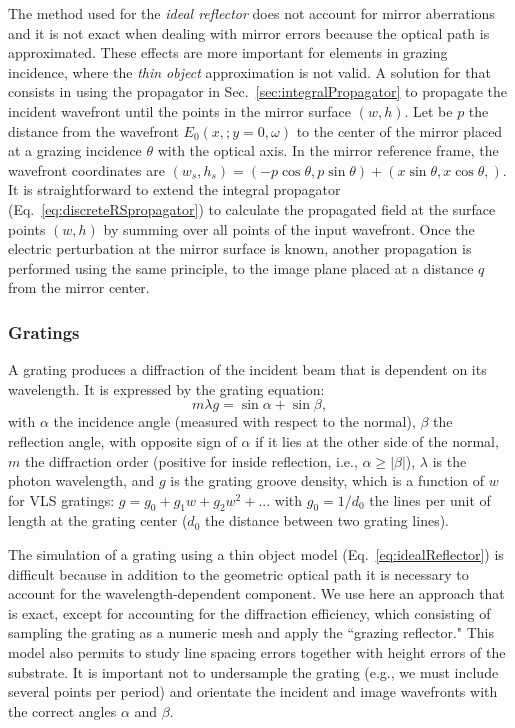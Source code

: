 \documentclass{iucr}
\begin{document}
The method used for the {\it ideal reflector} does not account for mirror aberrations and it is not exact when dealing with mirror errors because the optical path is approximated. These effects are more important for elements in grazing incidence, where the {\it thin object} approximation is not valid. A solution for that consists in using the propagator in Sec.~\ref{sec:integralPropagator} to propagate the incident wavefront until the points in the mirror surface $(w,h)$. Let be $p$ the distance from the wavefront $E_0(x,;y=0,\omega)$ to the center of the mirror placed at a grazing incidence $\theta$ with the optical axis. In the mirror reference frame, the wavefront coordinates are $(w_s, h_s) =(-p \cos \theta, p \sin \theta) + (x \sin \theta, x \cos \theta,)$. It is straightforward to extend the integral propagator (Eq.~\ref{eq:discreteRSpropagator}) to calculate the propagated field at the surface points $(w,h)$ by summing over all points of the input wavefront. Once the electric perturbation at the mirror surface is known, another propagation is performed using the same principle, to the image plane placed at a distance $q$ from the mirror center. 

\subsubsection{Gratings}
\label{sec:grating}

A grating produces a diffraction of the incident beam that is dependent on its wavelength. It is expressed by the grating equation:
\begin{equation}
    m \lambda g = \sin\alpha + \sin\beta,
\end{equation}
with $\alpha$ the incidence angle (measured with respect to the normal), $\beta$ the reflection angle, with opposite sign of $\alpha$ if it lies at the other side of the normal, $m$ the diffraction order (positive for inside reflection, i.e., $\alpha \ge |\beta|$),
$\lambda$ is the photon wavelength, and $g$ is the grating groove density, which is a function of $w$ for VLS gratings: $g = g_0 + g_1 w + g_2 w^2 + ...$ with $g_0 = 1/d_0$ the lines per unit of length at the grating center ($d_0$ the distance between two grating lines).

The simulation of a grating using a thin object model (Eq.~\ref{eq:idealReflector}) is difficult because in addition to the geometric optical path it is necessary to account for the wavelength-dependent component. We use here an approach that is exact, except for accounting for the diffraction efficiency, which consisting of sampling the grating as a numeric mesh and apply the ``grazing reflector." 
This model also permits to study line spacing errors together with height errors of the substrate. It is important not to undersample the grating (e.g., we must include several points per period) and orientate the incident and image wavefronts with the correct angles $\alpha$ and $\beta$.
\end{document}
